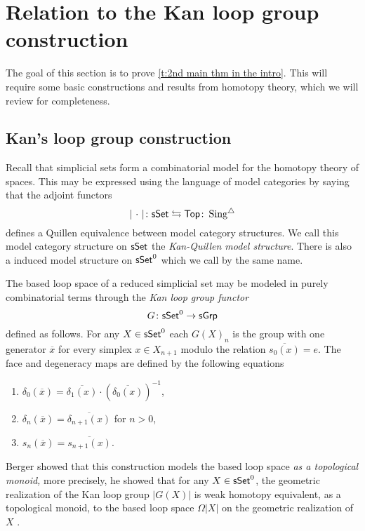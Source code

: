 
\section{Relation to the Kan loop group construction}

The goal of this section is to prove \cref{t:2nd main thm in the intro}. This will require some basic constructions and results from homotopy theory, which we will review for completeness. 

\subsection{Kan's loop group construction}

Recall that simplicial sets form a combinatorial model for the homotopy theory of spaces.
This may be expressed using the language of model categories by saying that the adjoint functors
\begin{equation*}
\vert{\ \cdot\ }\vert \colon \mathsf{sSet} \leftrightarrows \mathsf{Top} \colon \operatorname{Sing^{\triangle}}
\end{equation*}
defines a Quillen equivalence between model category structures.
We call this model category structure on $\mathsf{sSet}$ the \textit{Kan-Quillen model structure}.
There is also a induced model structure on $\mathsf{sSet}^0$ which we call by the same name.

The based loop space of a reduced simplicial set may be modeled in purely combinatorial terms through the \textit{Kan loop group functor} 
\begin{equation*}
G \colon \mathsf{sSet}^0 \to \mathsf{sGrp}
\end{equation*}
defined as follows.
For any $X \in \mathsf{sSet}^0$ each $G(X)_n$ is the group with one generator $\overline{x}$ for every simplex $x \in X_{n+1}$ modulo the relation $\overline{s_0(x)} = e$.
The face and degeneracy maps are defined by the following equations
\begin{enumerate}
    \item $\delta_0(\overline{x}) = \overline{\delta_1(x)} \cdot (\overline{\delta_0(x)})^{-1}$,
    \item $\delta_n(\overline{x})= \overline{\delta_{n+1}(x)}$ for $n >0$,
    \item $s_n(\overline{x})= \overline{s_{n+1}(x)}$.
\end{enumerate}

Berger showed that this construction models the based loop space \textit{as a topological monoid,} more precisely, he showed that for any $X \in \mathsf{sSet}^0$, the geometric realization of the Kan loop group $|G(X)|$ is weak homotopy equivalent, as a topological monoid, to the based loop space $\Omega|X|$ on the geometric realization of $X$ \cite{berger1995loops}.

